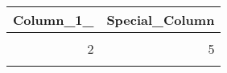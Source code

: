 \documentclass{article}
\begin{document}
\thispagestyle{empty}

\begin{table}
\centering
\begin{tabular}{rr}
\toprule
\textbf{Column\_1\_} & \textbf{Special\_Column}\\
\midrule
\cellcolor{blue!10}{1} & \cellcolor{blue!10}{4}\\
2 & 5\\
\cellcolor{blue!10}{3} & \cellcolor{blue!10}{6}\\
\bottomrule
\end{tabular}
\end{table}
\end{document}

